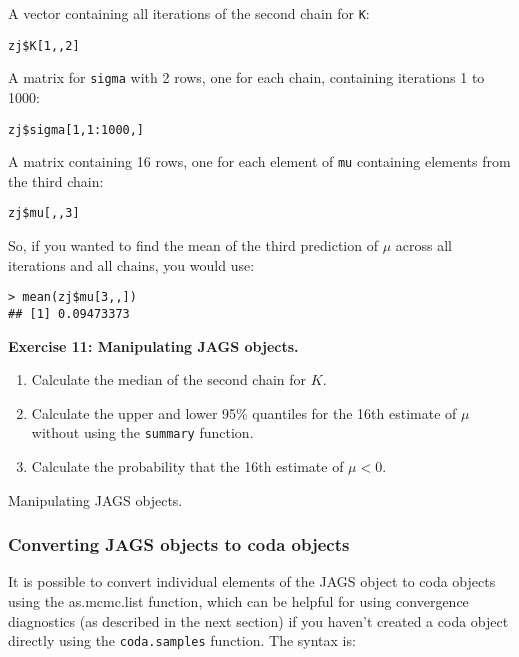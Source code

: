 \documentclass[12pt,english]{article}
\begin{document}
{\noindent A vector containing all iterations of the second chain for \texttt{K}:

\begin{Verbatim}
zj$K[1,,2]
\end{Verbatim}

\noindent A matrix for \texttt{sigma} with 2 rows, one for each chain, containing iterations 1 to 1000:

\begin{Verbatim}
zj$sigma[1,1:1000,]
\end{Verbatim}

\noindent A matrix containing 16 rows, one for each element of \texttt{mu} containing elements from the third chain:

\begin{Verbatim}
zj$mu[,,3]
\end{Verbatim}

\noindent So, if you wanted to find the mean of the third prediction of $\mu$ across all iterations and all chains, you would use:

\begin{Verbatim}
> mean(zj$mu[3,,])
## [1] 0.09473373
\end{Verbatim}

\bigskip
\belowcaptionskip=-40pt
\begin{exercise}
\begin{mdframed}
\doublespacing
\textbf{Exercise 11: Manipulating JAGS objects.} 
\begin{enumerate}
\item Calculate the median of the second chain for $K$.
\item Calculate the upper and lower 95\% quantiles for the 16th estimate of $\mu$ without using the \texttt{summary} function.
\item Calculate the probability that the 16th estimate of $\mu < 0$.
\end{enumerate}
\end{mdframed}
\captionsetup{textformat=empty, labelformat=empty}
\caption[Manipulating JAGS objects]{Manipulating JAGS objects.}
\label{ex: manipulating jags object}
\end{exercise}
\belowcaptionskip=0pt

\subsubsection{Converting JAGS objects to coda objects}

It is possible to convert individual elements of the JAGS object to coda objects using the as.mcmc.list function, which can be helpful for using convergence diagnostics (as described in the next section) if you haven't created a coda object directly using the \texttt{coda.samples} function. The syntax is:

}
\end{document}
